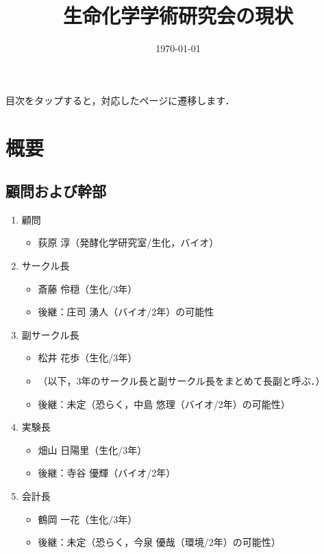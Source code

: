 \documentclass[a4paper,11pt]{ltjsarticle}
\title{生命化学学術研究会の現状}
\author{\today}
\date{}
\begin{document}
\pagestyle{fancy}
\rhead{}
\cfoot{\thepage}

\maketitle

\tableofcontents

\hspace*{12pt}

目次をタップすると，対応したページに遷移します．

\clearpage

\section{概要}

\subsection{顧問および幹部}

\begin{enumerate}
    \item 顧問
    \begin{itemize}
        \item 荻原 淳（発酵化学研究室/生化，バイオ）
    \end{itemize}
    \item サークル長
    \begin{itemize}
        \item 斎藤 伶穏（生化/3年）
        \item 後継：庄司 湧人（バイオ/2年）の可能性
    \end{itemize}
    \item 副サークル長
    \begin{itemize}
        \item 松井 花歩（生化/3年）
        \item （以下，3年のサークル長と副サークル長をまとめて長副と呼ぶ．）
        \item 後継：未定（恐らく，中島 悠理（バイオ/2年）の可能性）
    \end{itemize}
    \item 実験長
    \begin{itemize}
        \item 畑山 日陽里（生化/3年）
        \item 後継：寺谷 優輝（バイオ/2年）
    \end{itemize}
    \item 会計長
    \begin{itemize}
        \item 鶴岡 一花（生化/3年）
        \item 後継：未定（恐らく，今泉 優哉（環境/2年）の可能性）
    \end{itemize}
\end{enumerate}
\end{document}
